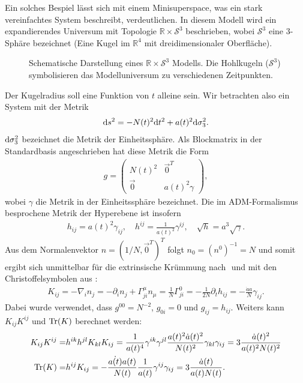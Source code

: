 \documentclass{scrartcl}
\begin{document}
			Ein solches Bespiel \cite{PhysRevD.28.2960} lässt sich mit einem Minisuperspace, was ein stark vereinfachtes System 
			beschreibt, verdeutlichen. In diesem Modell wird ein expandierendes Universum mit Topologie
			$\mathbb{R}\times \mathcal{S}^3$ beschrieben, wobei $\mathcal{S}^3$ eine 3-Sphäre bezeichnet (Eine Kugel im $\mathbb{R}^4$ mit dreidimensionaler Oberfläche).
			\begin{figure}
				\centering
				
				\caption{Schematische Darstellung eines $\mathbb{R}\times\mathcal{S}^3$ Modells. Die Hohlkugeln ($\mathcal{S}^3$) symbolisieren das Modelluniversum zu verschiedenen Zeitpunkten.}
			\end{figure}
			Der Kugelradius soll eine Funktion von $t$ alleine sein. Wir betrachten also ein System mit der Metrik
			\begin{align}
				{\rm d}s^2=-N(t)^2 {\rm d}t^2+a(t)^2{\rm d}\sigma_3^2.
			\end{align}
			${\rm d}\sigma_3^2$ bezeichnet die Metrik der Einheitssphäre. Als Blockmatrix in der Standardbasis angeschrieben hat diese Metrik
			die Form 
			\begin{align}
				g=\left(
					\begin{array}{cc} 
						N(t)^2 & \vec{0}^T\\ 
						\vec{0} & a(t)^2 \gamma
					\end{array}\right),
			\end{align}
			wobei $\gamma$ die Metrik in der Einheitssphäre bezeichnet. Die im ADM-Formalismus besprochene Metrik der Hyperebene ist insofern
			\begin{align}
				h_{ij}=a(t)^2\gamma_{ij},\quad h^{ij}=\frac{1}{a(t)^2}\gamma^{ij},\quad \sqrt{h}=a^3\sqrt{\gamma}.
			\end{align}
			Aus dem Normalenvektor $n=(1/N,\vec{0}^T)^T$ folgt $n_0=(n^0)^{-1}=N$ und somit ergibt sich unmittelbar für die extrinsische Krümmung nach $\label{def:extrcurv}$ und
			mit den Christoffelsymbolen aus \label{def:christ}:
			\begin{align}
				K_{ij}=-\nabla_i n_j=-\partial_i n_j+\Gamma^\mu_{ji}n_\mu=\frac{1}{N}\Gamma^0_{ji}=-\frac{1}{2N}\partial_t h_{ij}=-\frac{\dot{a}a}{N}\gamma_{ij}.
			\end{align}
			Dabei wurde verwendet, dass $g^{00}=N^{-2}$, $g_{0i}=0$ und $g_{ij}=h_{ij}$. Weiters kann $K_{ij}K^{ij}$ und ${\rm Tr}(K)$ berechnet werden:
			\begin{align}
				K_{ij}K^{ij}=&h^{ik}h^{jl}K_{kl}K_{ij}=\frac{1}{a(t)^4}\gamma^{ik}\gamma^{jl}\frac{a(t)^2\dot{a}(t)^2}{N(t)^2}\gamma_{kl}\gamma_{ij}=3\frac{\dot{a}(t)^2}{a(t)^2 N(t)^2}\\
				{\rm Tr}(K)=&h^{ij}K_{ij}=-\frac{\dot{a(t)}a(t)}{ N(t)}\frac{1}{a(t)}\gamma^{ij}\gamma_{ij}=3\frac{\dot{a}(t)}{a(t) N(t)}.
			\end{align}
\end{document}

